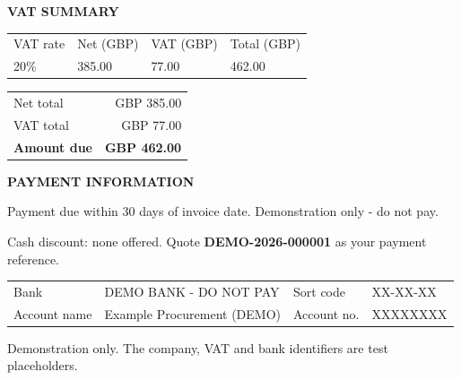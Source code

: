 \documentclass[10pt,a4paper]{article}
\begin{document}
\begin{minipage}{\textwidth}

{\small\bfseries VAT SUMMARY}\par
\begin{tabularx}{\textwidth}{@{}l >{\raggedleft\arraybackslash}X >{\raggedleft\arraybackslash}X >{\raggedleft\arraybackslash}X@{}}
\rowcolor{pale}\small VAT rate & \small Net (GBP) & \small VAT (GBP) & \small Total (GBP) \\

\small 20\% & \small 385.00 & \small 77.00 & \small 462.00 \\

\end{tabularx}

\vspace{3mm}
\begin{flushright}
\begin{tabular}{@{}lr@{}}
Net total & GBP 385.00 \\
VAT total & GBP 77.00 \\
\midrule
{\large\bfseries Amount due} & {\large\bfseries GBP 462.00} \\
\end{tabular}
\end{flushright}
\vspace{3mm}
{\small\bfseries PAYMENT INFORMATION}\par
{\small Payment due within 30 days of invoice date. Demonstration only - do not pay.\par
Cash discount: none offered. Quote \textbf{DEMO-2026-000001} as your payment reference.}
\vspace{2mm}
\colorbox{pale}{\parbox{\dimexpr\textwidth-2\fboxsep\relax}{\small
\begin{tabularx}{\linewidth}{@{}l X l X@{}}
Bank & DEMO BANK - DO NOT PAY & Sort code & XX-XX-XX \\
Account name & Example Procurement (DEMO) & Account no. & XXXXXXXX \\
\end{tabularx}}}

\par{\footnotesize\color{demo}Demonstration only. The company, VAT and bank identifiers are test placeholders.}

\end{minipage}
\end{document}
